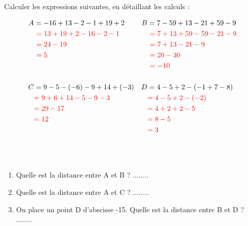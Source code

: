 \documentclass[Controlev1-correction]{subfiles}
\begin{document}
\begin{exercice}[(8 points)] Calculer les expressions suivantes, en détaillant les calculs :

	\begin{align*}
		A & = -16 + 13 - 2 - 1 + 19 + 2               & B & = 7 - 59 + 13 - 21 + 59 - 9                \\
		  & \ \correction{= 13 + 19 + 2 - 16 - 2 - 1} &   & \ \correction{= 7 + 13 + 59 - 59 - 21 - 9} \\
		  & \ \correction{= 24 - 19}                  &   & \ \correction{= 7 + 13 - 21 - 9}           \\
		  & \ \correction{= 5}                        &   & \ \correction{= 20 - 30}                   \\
		  &                                           &   & \ \correction{= -10}                       \\
		\\
		C & = 9 - 5 - (-6) - 9 + 14 + (-3)            & D & = 4 - 5 + 2 - (-1 + 7 - 8)                 \\
		  & \correction{= 9 + 6 + 14 - 5 - 9 - 3}     &   & \correction{= 4 - 5 + 2 - (-2)}            \\
		  & \correction{= 29 - 17}                    &   & \correction{= 4 + 2 + 2 - 5}               \\
		  & \correction{= 12}                         &   & \correction{= 8 - 5}                       \\
		  &                                           &   & \correction{= 3}                           \\
		\\
	\end{align*}
\end{exercice}

\begin{exercice}[(3 points)]\

	\begin{center}
	\end{center}

	\begin{enumerate}
		\item Quelle est la distance entre A et B ? ........
		\item Quelle est la distance entre A et C ? ........
		\item On place un point D d'abscisse -15. Quelle est la distance entre B et D ? ........
	\end{enumerate}
\end{exercice}
\end{document}
